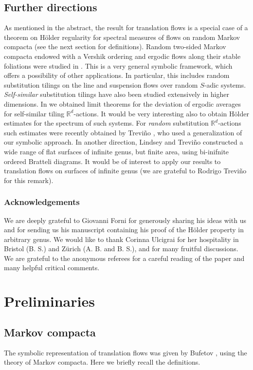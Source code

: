 \documentclass[10pt]{amsart}
\theoremstyle{plain}
\theoremstyle{definition}
\newcommand{\R}{\mathbb{R}}
\begin{document}
\subsection{Further directions} As mentioned in the abstract, the result for translation flows is a special case of a theorem on Hölder regularity for spectral measures of flows on random Markov compacta (see the next section for definitions).
Random two-sided Markov compacta endowed with a Vershik ordering and ergodic flows along their stable foliations were studied in \cite{Buf-umn}.
This is a very general symbolic framework, which offers a possibility of other applications. In particular, this includes random substitution tilings on the line and suspension flows over random $S$-adic systems.
\emph{Self-similar} substitution tilings have also been studied extensively in higher dimensions. In \cite{BuSol--limit} we obtained limit theorems for the deviation of ergodic averages for self-similar tiling $\R^d$-actions. It would be very interesting also to obtain Hölder estimates for the spectrum of such systems. For \emph{random} substitution $\R^d$-actions such estimates were recently obtained by
Trevi\~no \cite{Tre_prepint}, who used a generalization of our symbolic approach. In another direction,
Lindsey and Trevi\~no \cite{LinTre} constructed a wide range of flat surfaces of infinite genus, but finite area, using bi-inifnite ordered Bratteli diagrams. It would be of interest to apply our results to translation flows on surfaces of infinite genus (we are grateful to Rodrigo Trevi\~no for this remark).

\subsubsection*{Acknowledgements} We are deeply grateful to Giovanni Forni for generously sharing his ideas with us and for sending us his manuscript containing his proof of the Hölder property in arbitrary genus. We would like to thank Corinna Ulcigrai for her hospitality in Bristol (B. S.) and Zürich (A. B. and B. S.), and for many fruitful discussions. We are grateful to the anonymous referees for a careful reading of the paper and many helpful critical comments.

\section{Preliminaries}

\subsection{Markov compacta}\label{subsec:2.1}
The symbolic representation of translation flows was given by Bufetov \cite{Buf-umn}, using the theory of Markov compacta. Here we briefly recall the definitions.
\end{document}
